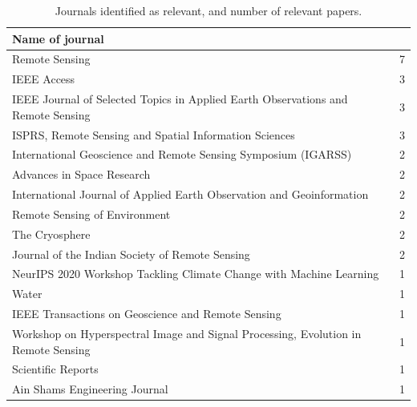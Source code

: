 \documentclass{article}
\begin{document}
\begin{table}[H]
    \centering
    \caption{Journals identified as relevant, and number of relevant papers.}
    \hspace{1cm}
    \label{tab:databases}
    \begin{tabularx}{\textwidth}{Xc}
        \hline
        \textbf{Name of journal}                                                           &   \\ \hline
        Remote Sensing                                                                     & 7 \\
        IEEE Access                                                                        & 3 \\
        IEEE Journal of Selected Topics in Applied Earth Observations and Remote Sensing   & 3 \\
        ISPRS, Remote Sensing and Spatial Information Sciences                             & 3 \\
        International Geoscience and Remote Sensing Symposium (IGARSS)                     & 2 \\
        Advances in Space Research                                                         & 2 \\
        International Journal of Applied Earth Observation and Geoinformation              & 2 \\
        Remote Sensing of Environment                                                      & 2 \\
        The Cryosphere                                                                     & 2 \\
        Journal of the Indian Society of Remote Sensing                                    & 2 \\
        NeurIPS 2020 Workshop Tackling Climate Change with Machine Learning                & 1 \\
        Water                                                                              & 1 \\
        IEEE Transactions on Geoscience and Remote Sensing                                 & 1 \\
        Workshop on Hyperspectral Image and Signal Processing, Evolution in Remote Sensing & 1 \\
        Scientific Reports                                                                 & 1 \\
        Ain Shams Engineering Journal                                                      & 1 \\

\end{tabularx}
\end{table}
\end{document}
